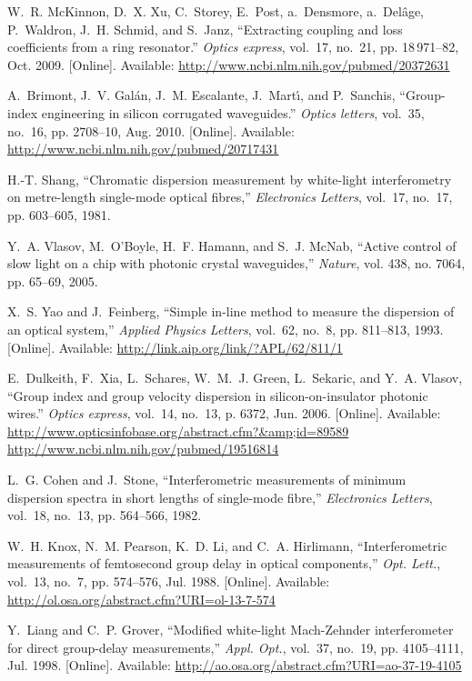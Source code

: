 \documentclass[journal]{IEEEtran}
\begin{document}
\begin{thebibliography}{10}
\BIBentryALTinterwordspacing
W.~R. McKinnon, D.~X. Xu, C.~Storey, E.~Post, a.~Densmore, a.~Del\^{a}ge,
  P.~Waldron, J.~H. Schmid, and S.~Janz, ``{Extracting coupling and loss
  coefficients from a ring resonator.}'' \emph{Optics express}, vol.~17,
  no.~21, pp. 18\,971--82, Oct. 2009. [Online]. Available:
  \url{http://www.ncbi.nlm.nih.gov/pubmed/20372631}
\BIBentrySTDinterwordspacing

\BIBentryALTinterwordspacing
A.~Brimont, J.~V. Gal\'{a}n, J.~M. Escalante, J.~Mart\'{\i}, and P.~Sanchis,
  ``{Group-index engineering in silicon corrugated waveguides.}'' \emph{Optics
  letters}, vol.~35, no.~16, pp. 2708--10, Aug. 2010. [Online]. Available:
  \url{http://www.ncbi.nlm.nih.gov/pubmed/20717431}
\BIBentrySTDinterwordspacing

H.-T. Shang, ``{Chromatic dispersion measurement by white-light interferometry
  on metre-length single-mode optical fibres},'' \emph{Electronics Letters},
  vol.~17, no.~17, pp. 603--605, 1981.

Y.~A. Vlasov, M.~O'Boyle, H.~F. Hamann, and S.~J. McNab, ``{Active control of
  slow light on a chip with photonic crystal waveguides},'' \emph{Nature}, vol.
  438, no. 7064, pp. 65--69, 2005.

\BIBentryALTinterwordspacing
X.~S. Yao and J.~Feinberg, ``{Simple in-line method to measure the dispersion
  of an optical system},'' \emph{Applied Physics Letters}, vol.~62, no.~8, pp.
  811--813, 1993. [Online]. Available:
  \url{http://link.aip.org/link/?APL/62/811/1}
\BIBentrySTDinterwordspacing

\BIBentryALTinterwordspacing
E.~Dulkeith, F.~Xia, L.~Schares, W.~M.~J. Green, L.~Sekaric, and Y.~A. Vlasov,
  ``{Group index and group velocity dispersion in silicon-on-insulator photonic
  wires.}'' \emph{Optics express}, vol.~14, no.~13, p. 6372, Jun. 2006.
  [Online]. Available:
  \url{http://www.opticsinfobase.org/abstract.cfm?\&amp;id=89589
  http://www.ncbi.nlm.nih.gov/pubmed/19516814}
\BIBentrySTDinterwordspacing

L.~G. Cohen and J.~Stone, ``{Interferometric measurements of minimum dispersion
  spectra in short lengths of single-mode fibre},'' \emph{Electronics Letters},
  vol.~18, no.~13, pp. 564--566, 1982.

\BIBentryALTinterwordspacing
W.~H. Knox, N.~M. Pearson, K.~D. Li, and C.~A. Hirlimann, ``{Interferometric
  measurements of femtosecond group delay in optical components},'' \emph{Opt.
  Lett.}, vol.~13, no.~7, pp. 574--576, Jul. 1988. [Online]. Available:
  \url{http://ol.osa.org/abstract.cfm?URI=ol-13-7-574}
\BIBentrySTDinterwordspacing

\BIBentryALTinterwordspacing
Y.~Liang and C.~P. Grover, ``{Modified white-light Mach-Zehnder interferometer
  for direct group-delay measurements},'' \emph{Appl. Opt.}, vol.~37, no.~19,
  pp. 4105--4111, Jul. 1998. [Online]. Available:
  \url{http://ao.osa.org/abstract.cfm?URI=ao-37-19-4105}
\BIBentrySTDinterwordspacing

\end{thebibliography}

% 
% 
\end{document}
